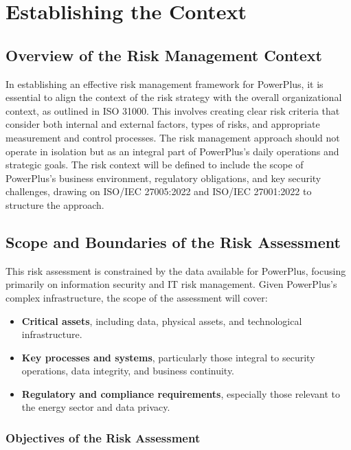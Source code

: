\chapter{Establishing the Context}

\section{Overview of the Risk Management Context}

In establishing an effective risk management framework for PowerPlus, it is essential to align the context of the risk strategy with the overall organizational context, as outlined in ISO 31000. 
This involves creating clear risk criteria that consider both internal and external factors, types of risks, and appropriate measurement and control processes. 
The risk management approach should not operate in isolation but as an integral part of PowerPlus’s daily operations and strategic goals.
The risk context will be defined to include the scope of PowerPlus’s business environment, regulatory obligations, and key security challenges, drawing on ISO/IEC 27005:2022 and ISO/IEC 27001:2022 to structure the approach. 

\section{Scope and Boundaries of the Risk Assessment}

This risk assessment is constrained by the data available for PowerPlus, focusing primarily on information security and IT risk management. Given PowerPlus’s complex infrastructure, the scope of the assessment will cover:
\begin{itemize}
    \item \textbf{Critical assets}, including data, physical assets, and technological infrastructure.
    \item \textbf{Key processes and systems}, particularly those integral to security operations, data integrity, and business continuity.
    \item \textbf{Regulatory and compliance requirements}, especially those relevant to the energy sector and data privacy.
\end{itemize}

\subsection{Objectives of the Risk Assessment}

